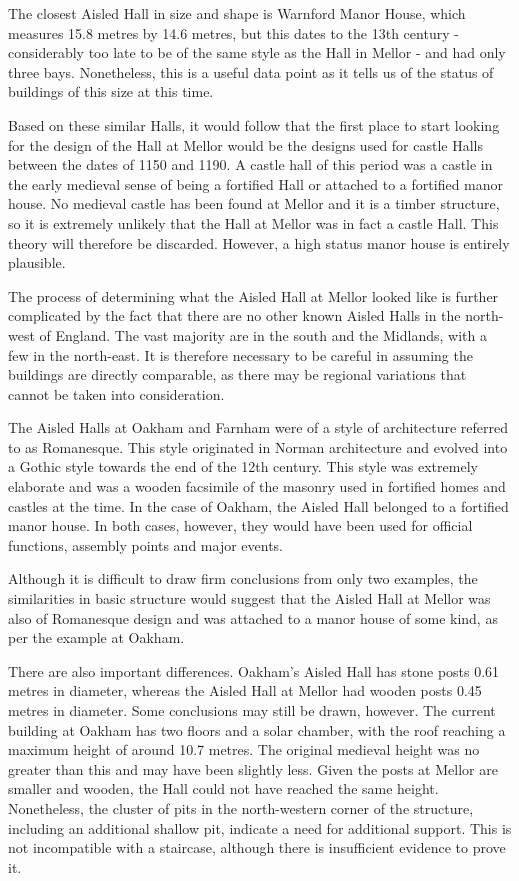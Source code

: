\documentclass[letterpaper,11pt,titlepage]{article}
\begin{document}
{The closest Aisled Hall in size and shape is Warnford Manor House, which measures 15.8 metres by 14.6 metres, but this dates to the 13th century - considerably too late to be of the same style as the Hall in Mellor - and had only three bays. Nonetheless, this is a useful data point as it tells us of the status of buildings of this size at this time.

Based on these similar Halls, it would follow that the first place to start looking for the design of the Hall at Mellor would be the designs used for castle Halls between the dates of 1150 and 1190. A castle hall of this period was a castle in the early medieval sense of being a fortified Hall or attached to a fortified manor house. No medieval castle has been found at Mellor and it is a timber structure, so it is extremely unlikely that the Hall at Mellor was in fact a castle Hall. This theory will therefore be discarded. However, a high status manor house is entirely plausible.

The process of determining what the Aisled Hall at Mellor looked like is further complicated by the fact that there are no other known Aisled Halls in the north-west of England. The vast majority are in the south and the Midlands, with a few in the north-east. It is therefore necessary to be careful in assuming the buildings are directly comparable, as there may be regional variations that cannot be taken into consideration.

The Aisled Halls at Oakham and Farnham were of a style of architecture referred to as Romanesque. This style originated in Norman architecture and evolved into a Gothic style towards the end of the 12th century. This style was extremely elaborate and was a wooden facsimile of the masonry used in fortified homes and castles at the time. In the case of Oakham, the Aisled Hall belonged to a fortified manor house. In both cases, however, they would have been used for official functions, assembly points and major events.

Although it is difficult to draw firm conclusions from only two examples, the similarities in basic structure would suggest that the Aisled Hall at Mellor was also of Romanesque design and was attached to a manor house of some kind, as per the example at Oakham.

There are also important differences. Oakham's Aisled Hall has stone posts 0.61 metres in diameter, whereas the Aisled Hall at Mellor had wooden posts 0.45 metres in diameter. Some conclusions may still be drawn, however. The current building at Oakham has two floors and a solar chamber, with the roof reaching a maximum height of around 10.7 metres. The original medieval height was no greater than this and may have been slightly less. Given the posts at Mellor are smaller and wooden, the Hall could not have reached the same height. Nonetheless, the cluster of pits in the north-western corner of the structure, including an additional shallow pit, indicate a need for additional support. This is not incompatible with a staircase, although there is insufficient evidence to prove it.

}
\end{document}

